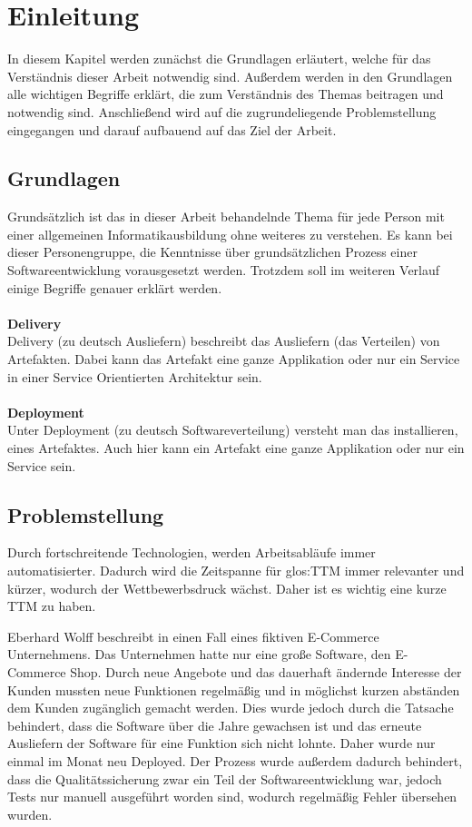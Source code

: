 \chapter{Einleitung}
\label{chap:einleitung}
In diesem Kapitel werden zunächst die Grundlagen erläutert, welche für das Verständnis dieser Arbeit notwendig sind. Außerdem werden in den Grundlagen alle wichtigen Begriffe erklärt, die zum Verständnis des Themas beitragen und notwendig sind. Anschließend wird auf die zugrundeliegende Problemstellung eingegangen und darauf aufbauend auf das Ziel der Arbeit.

\section{Grundlagen}
\label{sec:grundlagen}
Grundsätzlich ist das in dieser Arbeit behandelnde Thema für jede Person mit einer allgemeinen Informatikausbildung ohne weiteres zu verstehen. Es kann bei dieser Personengruppe, die Kenntnisse über grundsätzlichen Prozess einer Softwareentwicklung vorausgesetzt werden. Trotzdem soll im weiteren Verlauf einige Begriffe genauer erklärt werden.
\\\\
\textbf{Delivery}\\
Delivery (zu deutsch Ausliefern) beschreibt das Ausliefern (das Verteilen) von Artefakten. Dabei kann das Artefakt eine ganze Applikation oder nur ein Service in einer Service Orientierten Architektur sein.
\\\\
\textbf{Deployment}\\
Unter Deployment (zu deutsch Softwareverteilung) versteht man das installieren, eines Artefaktes. Auch hier kann ein Artefakt eine ganze Applikation oder nur ein Service sein.

\section{Problemstellung}
\label{sec:problemstellung}
Durch fortschreitende Technologien, werden Arbeitsabläufe immer automatisierter. Dadurch wird die Zeitspanne für \gls{glos:TTM} immer relevanter und kürzer, wodurch der Wettbewerbsdruck wächst. Daher ist es wichtig eine kurze TTM zu haben.

Eberhard Wolff beschreibt in \cite[S. 2 ff.]{EWolff:CD} einen Fall eines fiktiven E-Commerce Unternehmens.
Das Unternehmen hatte nur eine große Software, den E-Commerce Shop. Durch neue Angebote und das dauerhaft ändernde Interesse der Kunden mussten neue Funktionen regelmäßig und in möglichst kurzen abständen dem Kunden zugänglich gemacht werden. Dies wurde jedoch durch die Tatsache behindert, dass die Software über die Jahre gewachsen ist und das erneute Ausliefern der Software für eine Funktion sich nicht lohnte. Daher wurde nur einmal im Monat neu Deployed. Der Prozess wurde außerdem dadurch behindert, dass die Qualitätssicherung zwar ein Teil der Softwareentwicklung war, jedoch Tests nur manuell ausgeführt worden sind, wodurch regelmäßig Fehler übersehen wurden.

